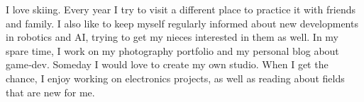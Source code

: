 

\begin{cvparagraph}

I love skiing. Every year I try to visit a different place to practice it with friends and family. I also like to keep myself regularly informed about new developments in robotics and AI, trying to get my nieces interested in them as well. In my spare time, I work on my photography portfolio and my personal blog about game‑dev. Someday I would love to create my own studio. When I get the chance, I enjoy working on electronics projects, as well as reading about fields that are new for me.

\end{cvparagraph}
